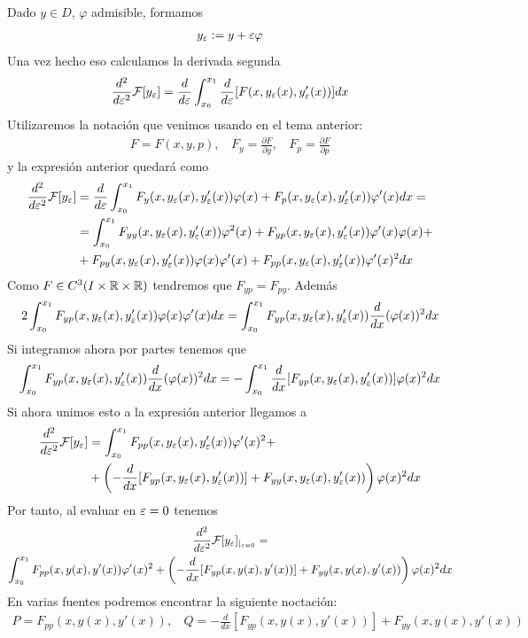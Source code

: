 Dado $y\in D$, $\varphi$ admisible, formamos
\begin{gather*}
    y_\varepsilon := y +\varepsilon \varphi
\end{gather*}
Una vez hecho eso calculamos la derivada segunda
\begin{gather*}
    \frac{d^2}{d\varepsilon^2}\mathcal{F}[y_\varepsilon] = \frac{d}{d\varepsilon} \int_{x_0}^{x_1} \frac{d}{d\varepsilon} [F(x, y_\varepsilon(x), y_\varepsilon'(x))] dx
\end{gather*}
Utilizaremos la notación que venimos usando en el tema anterior:
\begin{gather*}
    F=F(x,y,p),\ \ \ \ F_y=\frac{\partial F}{\partial y},\ \ \ \ F_p = \frac{\partial F}{\partial p}
\end{gather*}
y la expresión anterior quedará como 
\begin{align*}
    \frac{d^2}{d\varepsilon^2}\mathcal{F}[y_\varepsilon] &= \frac{d}{d\varepsilon} \int_{x_0}^{x_1} F_y(x,y_\varepsilon(x), y_\varepsilon'(x))\varphi(x) + F_p(x,y_\varepsilon(x), y_\varepsilon'(x))\varphi'(x)dx = \\
    &= \int_{x_0}^{x_1} F_{yy}(x,y_\varepsilon(x), y_\varepsilon'(x)) \varphi^2(x) + F_{yp}(x,y_\varepsilon(x), y_\varepsilon'(x))\varphi'(x)\varphi(x) + \\
    &+ F_{py}(x,y_\varepsilon(x), y_\varepsilon'(x))\varphi(x)\varphi'(x) + F_{pp}(x,y_\varepsilon(x), y_\varepsilon'(x))\varphi'(x)^2 dx
\end{align*}
Como $F\in C^3(I\times \mathbb{R} \times \mathbb{R})$ tendremos que $F_{yp}=F_{py}$. Además
\begin{gather*}
    2\int_{x_0}^{x_1} F_{yp}(x,y_\varepsilon(x), y_\varepsilon'(x)) \varphi(x)\varphi'(x) dx = \int_{x_0}^{x_1} F_{yp}(x,y_\varepsilon(x), y_\varepsilon'(x)) \frac{d}{dx}(\varphi(x))^2 dx
\end{gather*}
Si integramos ahora por partes tenemos que 
\begin{gather*}
    \int_{x_0}^{x_1} F_{yp}(x,y_\varepsilon(x), y_\varepsilon'(x)) \frac{d}{dx}(\varphi(x))^2 dx = -\int_{x_0}^{x_1} \frac{d}{dx} [F_{yp}(x,y_\varepsilon(x), y_\varepsilon'(x))] \varphi(x)^2 dx
\end{gather*}
Si ahora unimos esto a la expresión anterior llegamos a 
\begin{align*}
    \frac{d^2}{d\varepsilon^2}\mathcal{F}[y_\varepsilon] &= \int_{x_0}^{x_1} F_{pp}(x,y_\varepsilon(x), y_\varepsilon'(x)) \varphi'(x)^2 +\\
    &+ \left(-\frac{d}{dx}[F_{yp}(x,y_\varepsilon(x), y_\varepsilon'(x)) ] + F_{yy}(x,y_\varepsilon(x), y_\varepsilon'(x))\right)\varphi(x)^2 dx
\end{align*}
Por tanto, al evaluar en $\varepsilon = 0$ tenemos
\begin{gather*}
    \frac{d^2}{d\varepsilon^2}\mathcal{F}[y_\varepsilon]_{|_{\varepsilon=0}} =\\
    \int_{x_0}^{x_1} F_{pp}(x,y(x), y'(x)) \varphi'(x)^2 + \left(-\frac{d}{dx}[F_{yp}(x,y(x), y'(x)) ] + F_{yy}(x,y(x), y'(x))\right)\varphi(x)^2 dx
\end{gather*}
En varias fuentes podremos encontrar la siguiente noctación:
\begin{gather*}
    P = F_{pp}(x,y(x), y'(x)),\ \ \ \ Q = -\frac{d}{dx}[F_{yp}(x,y(x), y'(x)) ] + F_{yy}(x,y(x), y'(x))
\end{gather*}

